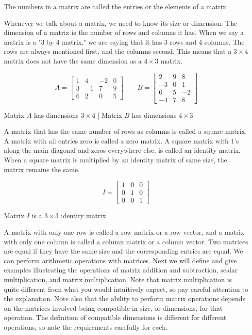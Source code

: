 The numbers in a matrix are called the entries or the elements of a matrix.

Whenever we talk about a matrix, we need to know its size or dimension. The dimension of a matrix is the number of rows and columns it has. When we say a matrix is a "3 by 4 matrix," we are saying that it has 3 rows and 4 columns. The rows are always mentioned first, and the columns second. This means that a $3 \times 4$ matrix does not have the same dimension as a $4 \times 3$ matrix.


\[
    A =
    \begin{bmatrix}
        1 & 4  & -2 & 0 \\
        3 & -1 & 7  & 9 \\
        6 & 2  & 0  & 5
    \end{bmatrix}
    \qquad
    B =
    \begin{bmatrix}
        2  & 9 & 8  \\
        -3 & 0 & 1  \\
        6  & 5 & -2 \\
        -4 & 7 & 8
    \end{bmatrix}
\]

Matrix \( A \) has dimensions \( 3 \times 4 \) \quad | \quad Matrix \( B \) has dimensions \( 4 \times 3 \)

A matrix that has the same number of rows as columns is called a square matrix.
A matrix with all entries zero is called a zero matrix.
A square matrix with 1's along the main diagonal and zeros everywhere else, is called an identity matrix.   When a square matrix is multiplied by an identity matrix of same size, the matrix remains the same.

\[
    I =
    \begin{bmatrix}
        1 & 0 & 0 \\
        0 & 1 & 0 \\
        0 & 0 & 1
    \end{bmatrix}
\]

Matrix \( I \) is a \( 3 \times 3 \) identity matrix

A matrix with only one row is called a row matrix or a row vector, and a matrix with only one column is called a column matrix or a column vector.
Two matrices are equal if they have the same size and the corresponding entries are equal.
We can perform arithmetic operations with matrices.  Next we will define and give examples illustrating the operations of matrix addition and subtraction, scalar multiplication, and matrix multiplication.  Note that matrix multiplication is quite different from what you would intuitively expect, so pay careful attention to the explanation.  Note also that the ability to perform matrix operations depends on the matrices involved being compatible in size, or dimensions, for that operation.  The definition of compatible dimensions is different for different operations, so note the requirements carefully for each.



